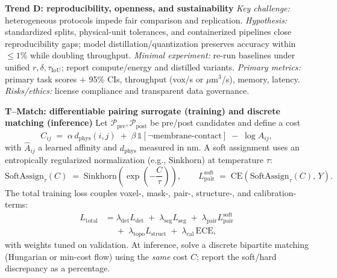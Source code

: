 \medskip
\noindent\textbf{Trend D: reproducibility, openness, and sustainability}\;
\emph{Key challenge:} heterogeneous protocols impede fair comparison and replication. 
\emph{Hypothesis:} standardized splits, physical-unit tolerances, and containerized pipelines close reproducibility gaps; model distillation/quantization preserves accuracy within \(\leq 1\%\) while doubling throughput. 
\emph{Minimal experiment:} re-run baselines under unified \(r,\delta,\tau_{\mathrm{IoU}}\); report compute/energy and distilled variants. 
\emph{Primary metrics:} primary task scores \(+\) 95\% CIs, throughput (vox/s or \(\mu\mathrm{m}^3\)/s), memory, latency. 
\emph{Risks/ethics:} license compliance and transparent data governance.

\medskip
\noindent\textbf{T--Match: differentiable pairing surrogate (training) and discrete matching (inference)}\;
Let \(\mathcal{P}_{\mathrm{pre}},\mathcal{P}_{\mathrm{post}}\) be pre/post candidates and define a cost
\[
C_{ij} \;=\; \alpha\, d_{\mathrm{phys}}(i,j) \;+\; \beta\,\mathbb{1}\!\left[\neg\text{membrane-contact}\right] \;-\; \log \hat A_{ij},
\]
with \(\hat A_{ij}\) a learned affinity and \(d_{\mathrm{phys}}\) measured in nm. A soft assignment uses an entropically regularized normalization (e.g., Sinkhorn) at temperature \(\tau\):
\[
\mathrm{SoftAssign}_\tau(C)\;=\;\mathrm{Sinkhorn}\!\left(\exp\!\left(-\frac{C}{\tau}\right)\right), 
\qquad
L_{\mathrm{pair}}^{\mathrm{soft}}\;=\;\mathrm{CE}\!\left(\mathrm{SoftAssign}_\tau(C),\,Y\right).
\]
The total training loss couples voxel-, mask-, pair-, structure-, and calibration-terms:
\[
\begin{aligned}
L_{\mathrm{total}}
&=\lambda_{\mathrm{det}} L_{\mathrm{det}}
\;+\;\lambda_{\mathrm{seg}} L_{\mathrm{seg}}
\;+\;\lambda_{\mathrm{pair}} L_{\mathrm{pair}}^{\mathrm{soft}} \\
&\quad
\;+\;\lambda_{\mathrm{topo}} L_{\mathrm{struct}}
\;+\;\lambda_{\mathrm{cal}}\,\mathrm{ECE},
\end{aligned}
\]
with weights tuned on validation. At inference, solve a discrete bipartite matching (Hungarian or min-cost flow) using the \emph{same} cost \(C\); report the soft/hard discrepancy as a percentage.

